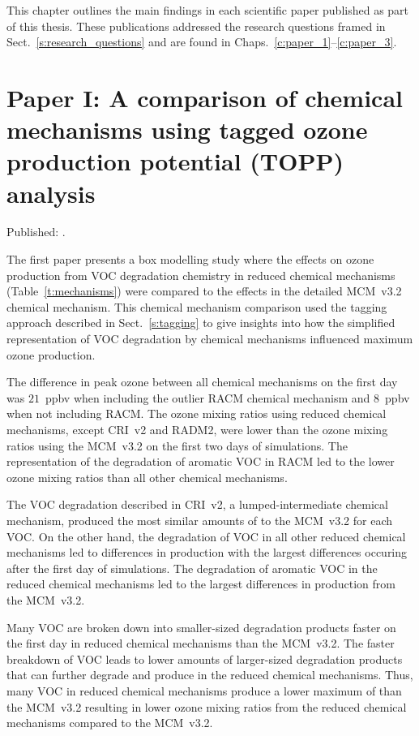 This chapter outlines the main findings in each scientific paper published as part of this thesis.
These publications addressed the research questions framed in Sect.~\ref{s:research_questions} and are found in Chaps.~\ref{c:paper_1}--\ref{c:paper_3}.

\singlespacing
\section[Paper I]{Paper I: A comparison of chemical mechanisms using tagged ozone production potential (TOPP) analysis} \label{s:chemical_mechanism_results}

\onehalfspacing

\noindent
Published: .

The first paper presents a box modelling study where the effects on ozone production from VOC degradation chemistry in reduced chemical mechanisms (Table~\ref{t:mechanisms}) were compared to the effects in the detailed MCM~v3.2 chemical mechanism.
This chemical mechanism comparison used the tagging approach described in Sect.~\ref{s:tagging} to give insights into how the simplified representation of VOC degradation by chemical mechanisms influenced maximum ozone production.

The difference in peak ozone between all chemical mechanisms on the first day was $21$~ppbv when including the outlier RACM chemical mechanism and $8$~ppbv when not including RACM.
The ozone mixing ratios using reduced chemical mechanisms, except CRI~v2 and RADM2, were lower than the ozone mixing ratios using the MCM~v3.2 on the first two days of simulations.
The representation of the degradation of aromatic VOC in RACM led to the lower ozone mixing ratios than all other chemical mechanisms.

The VOC degradation described in CRI~v2, a lumped-intermediate chemical mechanism, produced the most similar amounts of  to the MCM~v3.2 for each VOC.
On the other hand, the degradation of VOC in all other reduced chemical mechanisms led to differences in  production with the largest differences occuring after the first day of simulations.
The degradation of aromatic VOC in the reduced chemical mechanisms led to the largest differences in  production from the MCM~v3.2.

Many VOC are broken down into smaller-sized degradation products faster on the first day in reduced chemical mechanisms than the MCM~v3.2.
The faster breakdown of VOC leads to lower amounts of larger-sized degradation products that can further degrade and produce  in the reduced chemical mechanisms.
Thus, many VOC in reduced chemical mechanisms produce a lower maximum of  than the MCM~v3.2 resulting in lower ozone mixing ratios from the reduced chemical mechanisms compared to the MCM~v3.2.

